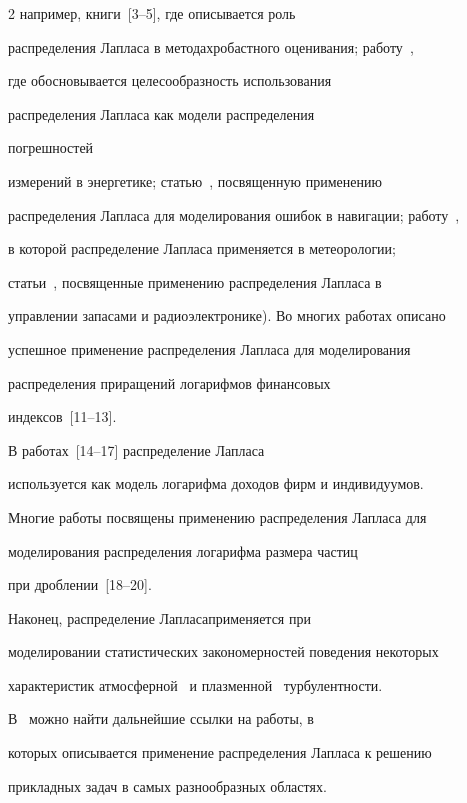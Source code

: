 \begin{multicols}{2}
например, книги~[3--5], где описывается роль


распределения Лапласа в методах\linebreak робастного оценивания; работу~\cite{30be},


где обосновывается целесообразность использования


распределения Лапласа как модели распределения\linebreak


 погрешностей


измерений в энергетике; статью~\cite{37be}, посвященную применению


распределения Лапласа для моделирования ошибок в навигации; работу~\cite{48be},


в которой распределение Лапласа применяется в метеорологии;


статьи~\cite{21be, 28be}, посвященные применению распределения Лапласа в


управлении запасами и радиоэлектронике). Во многих работах описано


успешное применение распределения Лап\-ла\-са для моделирования


распределения приращений логарифмов финансовых


индексов~[11--13].


В работах~[14--17] распределение Лапласа


используется как модель логарифма доходов фирм и индивидуумов.


Многие работы посвящены применению распределения Лапласа для


моделирования распределения логарифма размера частиц


при дроб\-ле\-нии~[18--20].


Наконец, распределение Лапласа\linebreak применяется при


моделировании статистических закономерностей поведения некоторых


характе\-ристик атмосферной~\cite{24be} и плазменной~\cite{11be} турбулентности.


В~\cite{39be, 43be} можно найти дальнейшие ссылки на работы, в


которых описывается применение распределения Лапласа к решению


прикладных задач в самых разнообразных областях.











\end{multicols}
